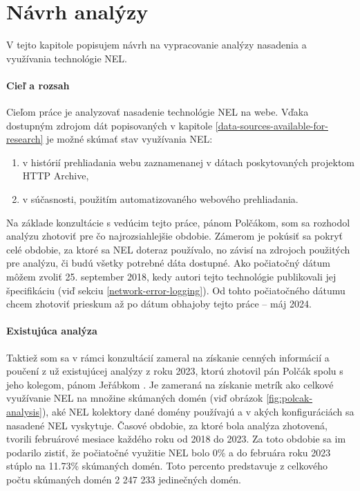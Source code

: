 \chapter{Návrh analýzy}
\label{possible-analysis-strategies}

V tejto kapitole popisujem návrh na vypracovanie analýzy nasadenia a využívania technológie NEL.

\subsubsection{Cieľ a rozsah}

Cieľom práce je analyzovať nasadenie technológie NEL na webe. 
Vďaka dostupným zdrojom dát popisovaných v kapitole \ref{data-sources-available-for-research} je možné skúmať stav využívania NEL:
\begin{enumerate}
    \item v histórií prehliadania webu zaznamenanej v dátach poskytovaných projektom HTTP Archive,
    \item v súčasnosti, použitím automatizovaného webového prehliadania.
\end{enumerate}

Na základe konzultácie s vedúcim tejto práce, pánom Polčákom, som sa rozhodol analýzu zhotoviť pre čo 
najrozsiahlejšie obdobie.
Zámerom je pokúsiť sa pokryť celé obdobie, za ktoré sa NEL doteraz používalo, no závisí na zdrojoch použitých pre analýzu, či budú všetky potrebné dáta dostupné.
Ako počiatočný dátum môžem zvoliť 25. september 2018, kedy autori tejto technológie publikovali jej špecifikáciu (viď sekciu \ref{network-error-logging}).
Od tohto počiatočného dátumu chcem zhotoviť prieskum až po dátum obhajoby tejto práce -- máj 2024.

\subsubsection{Existujúca analýza}

Taktiež som sa v rámci konzultácií zameral na získanie cenných informácií a poučení z už existujúcej analýzy z roku 2023,
ktorú zhotovil pán Polčák spolu s jeho kolegom, pánom Jeřábkom \cite{nel-http-archive}.
Je zameraná na získanie metrík ako celkové využívanie NEL na množine skúmaných domén (viď obrázok \ref{fig:polcak-analysis}), aké NEL kolektory dané domény používajú a v akých konfiguráciách sa nasadené NEL vyskytuje.
Časové obdobie, za ktoré bola analýza zhotovená, tvorili februárové mesiace každého roku od 2018 do 2023. 
Za toto obdobie sa im podarilo zistiť, že počiatočné využitie NEL bolo 0\% a do februára roku 2023 stúplo na 11.73\% skúmaných domén.
Toto percento predstavuje z celkového počtu skúmaných domén 2 247 233 jedinečných domén.

